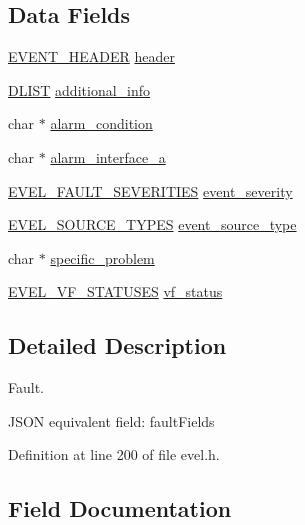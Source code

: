 \subsection*{Data Fields}
\begin{DoxyCompactItemize}
\item 
\hyperlink{evel_8h_aa0ea94c675729365ea7825c4fc7e06d8}{E\+V\+E\+N\+T\+\_\+\+H\+E\+A\+D\+E\+R} \hyperlink{structevent__fault_a4d189397d39b197f2c6e2527be76b5f9}{header}
\item 
\hyperlink{double__list_8h_a45f4a129042d9e1aa4ffd31fe13e4d14}{D\+L\+I\+S\+T} \hyperlink{structevent__fault_a68765630c9cb8e88a482778e0bab551d}{additional\+\_\+info}
\item 
char $\ast$ \hyperlink{structevent__fault_ad8cee6bd12f2cd91f2c6e5b26b6fe99a}{alarm\+\_\+condition}
\item 
char $\ast$ \hyperlink{structevent__fault_aa41c0fa6282ea720a91b0ac8af017852}{alarm\+\_\+interface\+\_\+a}
\item 
\hyperlink{evel_8h_ac52696495e0b34b23a0726f467670d0f}{E\+V\+E\+L\+\_\+\+F\+A\+U\+L\+T\+\_\+\+S\+E\+V\+E\+R\+I\+T\+I\+E\+S} \hyperlink{structevent__fault_a9d3b19de8267d39bc6cd30d00fc8d00b}{event\+\_\+severity}
\item 
\hyperlink{evel_8h_a304eae0d024005dc4c7031bdd774d64a}{E\+V\+E\+L\+\_\+\+S\+O\+U\+R\+C\+E\+\_\+\+T\+Y\+P\+E\+S} \hyperlink{structevent__fault_ae724b6a8c8056d11fae378da50063577}{event\+\_\+source\+\_\+type}
\item 
char $\ast$ \hyperlink{structevent__fault_ac527105fea5c184089d8b5e7440c5bef}{specific\+\_\+problem}
\item 
\hyperlink{evel_8h_a940888ae37017b9f85d793972994c8f0}{E\+V\+E\+L\+\_\+\+V\+F\+\_\+\+S\+T\+A\+T\+U\+S\+E\+S} \hyperlink{structevent__fault_aa82d21b95c0d1ef7ab6740a9b52f722f}{vf\+\_\+status}
\end{DoxyCompactItemize}


\subsection{Detailed Description}
Fault. 

J\+S\+O\+N equivalent field\+: fault\+Fields 

Definition at line 200 of file evel.\+h.



\subsection{Field Documentation}
\hypertarget{structevent__fault_a68765630c9cb8e88a482778e0bab551d}{}
